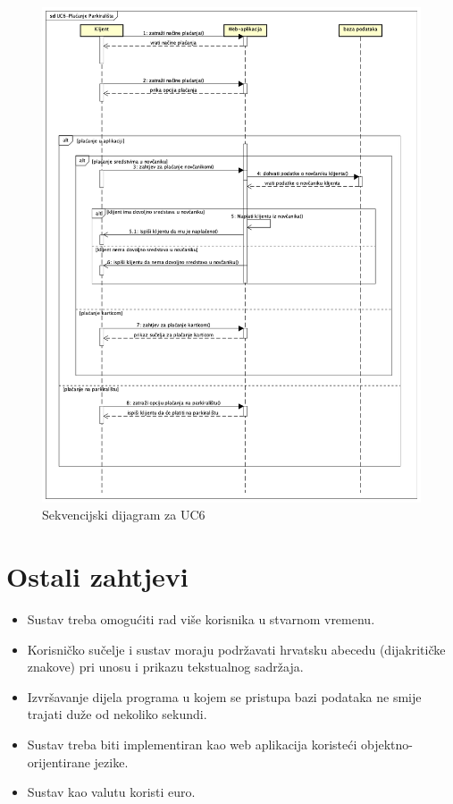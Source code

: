 				      \begin{figure}[hbt!]
				      	\centering
				      	\includegraphics[width=0.7\linewidth]{slike/SeqDijagram6.png}
				      	\caption{Sekvencijski dijagram za UC6}
				      	\label{fig:SeqDijagram6}
				      \end{figure}
				      
				    
				    
				    
		   	\eject
	
		\section{Ostali zahtjevi}
		
			\begin{itemize}
				\item Sustav treba omogućiti rad više korisnika u stvarnom vremenu.
				\item Korisničko sučelje i sustav moraju podržavati hrvatsku abecedu (dijakritičke znakove) pri unosu i prikazu tekstualnog sadržaja.
				\item Izvršavanje dijela programa u kojem se pristupa bazi podataka ne smije trajati duže od nekoliko sekundi.
				\item Sustav treba biti implementiran kao web aplikacija koristeći objektno-orijentirane jezike.				
				\item Sustav kao valutu koristi euro. 
			\end{itemize}
			 
			 
			 
	
